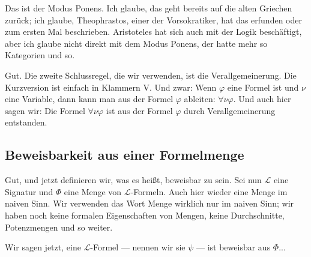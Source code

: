 \begin{spoken-clean}[00:15:23 - 00:17:13]
Das ist der Modus Ponens. Ich glaube, das geht bereits auf die alten Griechen zurück; ich glaube, Theophrastos, einer der Vorsokratiker, hat das erfunden oder zum ersten Mal beschrieben. Aristoteles hat sich auch mit der Logik beschäftigt, aber ich glaube nicht direkt mit dem Modus Ponens, der hatte mehr so Kategorien und so.

Gut. Die zweite Schlussregel, die wir verwenden, ist die Verallgemeinerung. Die Kurzversion ist einfach in Klammern V. Und zwar: Wenn $\varphi$ eine Formel ist und $\nu$ eine Variable, dann kann man aus der Formel $\varphi$ ableiten: $\forall \nu \varphi$. Und auch hier sagen wir: Die Formel $\forall \nu \varphi$ ist aus der Formel $\varphi$ durch Verallgemeinerung entstanden.
\end{spoken-clean}

\begin{math-stroke}
\end{math-stroke}

\subsection{Beweisbarkeit aus einer Formelmenge}

\begin{spoken-clean}[00:17:13 - 00:19:15]
Gut, und jetzt definieren wir, was es heißt, beweisbar zu sein. Sei nun $\mathcal{L}$ eine Signatur und $\Phi$ eine Menge von $\mathcal{L}$-Formeln. Auch hier wieder eine Menge im naiven Sinn. Wir verwenden das Wort Menge wirklich nur im naiven Sinn; wir haben noch keine formalen Eigenschaften von Mengen, keine Durchschnitte, Potenzmengen und so weiter.

Wir sagen jetzt, eine $\mathcal{L}$-Formel --- nennen wir sie $\psi$ --- ist beweisbar aus $\Phi$...
\end{spoken-clean}

